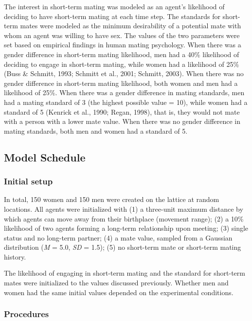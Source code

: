 \documentclass[
  11pt,
]{article}
\begin{document}
The interest in short-term mating was modeled as an agent's likelihood
of deciding to have short-term mating at each time step. The standards
for short-term mates were modeled as the minimum desirability of a
potential mate with whom an agent was willing to have sex. The values of
the two parameters were set based on empirical findings in human mating
psychology. When there was a gender difference in short-term mating
likelihood, men had a 40\% likelihood of deciding to engage in
short-term mating, while women had a likelihood of 25\% (Buss \&
Schmitt, 1993; Schmitt et al., 2001; Schmitt, 2003). When there was no
gender difference in short-term mating likelihood, both women and men
had a likelihood of 25\%. When there was a gender difference in mating
standards, men had a mating standard of 3 (the highest possible value =
10), while women had a standard of 5 (Kenrick et al., 1990; Regan,
1998), that is, they would not mate with a person with a lower mate
value. When there was no gender difference in mating standards, both men
and women had a standard of 5.

\hypertarget{model-schedule}{%
\subsection{Model Schedule}\label{model-schedule}}

\hypertarget{initial-setup}{%
\subsubsection{Initial setup}\label{initial-setup}}

In total, 150 women and 150 men were created on the lattice at random
locations. All agents were initialized with (1) a three-unit maximum
distance by which agents can move away from their birthplace (movement
range); (2) a 10\% likelihood of two agents forming a long-term
relationship upon meeting; (3) single status and no long-term partner;
(4) a mate value, sampled from a Gaussian distribution (\emph{M} = 5.0,
\emph{SD} = 1.5); (5) no short-term mate or short-term mating history.

The likelihood of engaging in short-term mating and the standard for
short-term mates were initialized to the values discussed previously.
Whether men and women had the same initial values depended on the
experimental conditions.

\hypertarget{procedures}{%
\subsubsection{Procedures}\label{procedures}}
\end{document}
